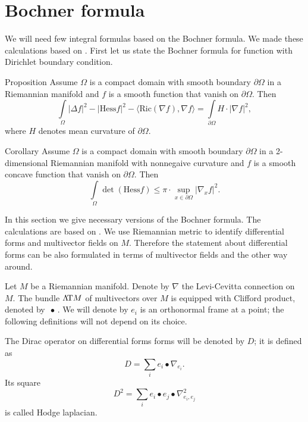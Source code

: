\section{Bochner formula}\label{sec:bochner}


We will need few integral formulas based on the Bochner formula.
We made these calculations based on \cite[Chapter II]{lawson-michelsohn}.
First let us state the Bochner formula for function with Dirichlet boundary condition.

\begin{thm}{Proposition}\label{prop:bochner-dirichle-old}
Assume $\Omega$ is a compact domain with smooth boundary $\partial \Omega$ in a Riemannian manifold
and $f$ is a smooth function that vanish on $\partial \Omega$.
Then
\[\int\limits_\Omega |\Delta f|^2
-|\mathrm{Hess}f|^2
-\langle\mathrm{Ric}(\nabla f),\nabla f\rangle
=\int\limits_{\partial\Omega}
H\cdot|\nabla f|^2,\]
where $H$ denotes mean curvature of $\partial \Omega$.
\end{thm}
 
\begin{thm}{Corollary}
Assume $\Omega$ is a compact domain with smooth boundary $\partial \Omega$ in a 2-dimensional Riemannian manifold with nonnegaive curvature
and $f$ is a smooth concave function that vanish on $\partial \Omega$.
Then
\[\int\limits_\Omega 
\det(\mathrm{Hess}f)
\le\pi\cdot\sup_{x\in\partial\Omega}|\nabla_x f|^2.\]

\end{thm}




In this section we give necessary versions of the Bochner formula.
The calculations are based on \cite[Chapter II]{lawson-michelsohn}.
We use Riemannian metric to identify differential forms and multivector fields on $M$.
Therefore the statement about differential forms can be also formulated in terms of multivector fields and the other way around.


Let $M$ be a Riemannian manifold.
Denote by $\nabla$ the Levi-Cevitta connection on $M$.
The bundle $\Lambda\!\mathrm{T} M$ of multivectors over $M$ is equipped with Clifford product, denoted by $\,\bullet \,$.
We will denote by $e_i$ is an orthonormal frame at a point; the following definitions will not depend on its choice.

The Dirac operator on differential forms forms will be denoted by $D$;
it is defined as
\[D=\sum_i e_i\bullet \nabla_{e_i}.\]
Its square 
\[D^2=\sum_i e_i\bullet e_j\bullet \nabla^2_{e_i,e_j}\]
is called Hodge laplacian.

